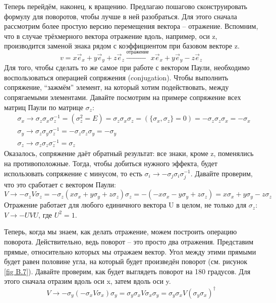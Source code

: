 Теперь перейдём, наконец, к вращению. Предлагаю пошагово сконструировать формулу для поворотов, чтобы лучше в ней разобраться. Для этого сначала рассмотрим более простую версию перемещения вектора -- отражение. Вспомним, что в случае трёхмерного вектора отражение вдоль, например, оси z, производится заменой знака рядом с коэффициентом при базовом векторе z.
\[
v = x\vec{e}_x + y\vec{e}_y + z\vec{e}_z\xrightarrow{\text{отражение}} x\vec{e}_x + y\vec{e}_y - z\vec{e}_z
\]
Для того, чтобы сделать то же самое при работе с вектором Паули, необходимо воспользоваться операцией сопряжения (conjugation). Чтобы выполнить сопряжение, ``зажмём'' элемент, на который хотим подействовать, между сопрягаемыми элементами. Давайте посмотрим на примере сопряжение всех матриц Паули по матрице $\sigma_z$:
\begin{align*}
&\sigma_x\rightarrow \sigma_z\sigma_x\sigma^{-1}_z = \left(\sigma_z^2 = E\right) = \sigma_z\sigma_x\sigma_z = \left(\{\sigma_x, \sigma_z\} = 0\right) = -\sigma_z\sigma_z\sigma_x = -\sigma_x\\
&\sigma_y\rightarrow \sigma_z\sigma_y\sigma_z^{-1} = -\sigma_z\sigma_z\sigma_y = -\sigma_y\\
&\sigma_z\rightarrow \sigma_z\sigma_z\sigma_z^{-1} = \sigma_z
\end{align*}
Оказалось, сопряжение даёт обратный результат: все знаки, кроме z, поменялись на противоположные. Тогда, чтобы добиться нужного эффекта, будет использовать сопряжение с минусом, то есть $\sigma_i \rightarrow -\sigma_j\sigma_i\sigma_j^{-1}$. Давайте проверим, что это сработает с вектором Паули:
\[
    V \rightarrow -\sigma_z V\sigma_z = -\sigma_z \left(x\sigma_x + y\sigma_y + z\sigma_z\right)\sigma_z = -(-x\sigma_x - y\sigma_y + z\sigma_z) = x\sigma_x + y\sigma_y - z\sigma_z
\]
Отражение работает для любого единичного вектора U в целом, не только для $\sigma_z$: $V \rightarrow -UVU$, где $U^2 = 1$.

Теперь, когда мы знаем, как делать отражение, можем построить операцию поворота. Действительно, ведь поворот -- это просто два отражения. Представим прямые, относительно которых мы отражаем вектор. Угол между этими прямыми будет равен половине угла, на который будет произведён поворот (см. рисунок \ref{fig B.7}). Давайте проверим, как будет выглядеть поворот на 180 градусов. Для этого сначала отразим вдоль оси x, затем вдоль оси y.
\[
V \rightarrow -\sigma_y\left(-\sigma_xV\sigma_x\right)\sigma_y = \sigma_y\sigma_xV\sigma_x\sigma_y = \sigma_y\sigma_xV(\sigma_y\sigma_x)^{\dagger}
\]


